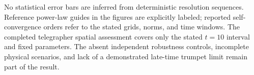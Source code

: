 No statistical error bars are inferred from deterministic resolution sequences. Reference power-law guides in the figures are explicitly labeled; reported self-convergence orders refer to the stated grids, norms, and time windows. The completed telegrapher spatial assessment covers only the stated $t=10$ interval and fixed parameters. The absent independent robustness controls, incomplete physical scenarios, and lack of a demonstrated late-time trumpet limit remain part of the result.
